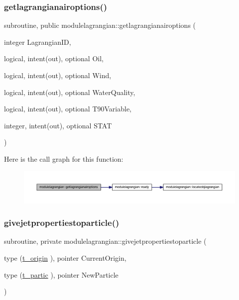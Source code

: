 \subsubsection{\texorpdfstring{getlagrangianairoptions()}{getlagrangianairoptions()}}
{\footnotesize\ttfamily subroutine, public modulelagrangian\+::getlagrangianairoptions (\begin{DoxyParamCaption}\item[{integer}]{Lagrangian\+ID,  }\item[{logical, intent(out), optional}]{Oil,  }\item[{logical, intent(out), optional}]{Wind,  }\item[{logical, intent(out), optional}]{Water\+Quality,  }\item[{logical, intent(out), optional}]{T90\+Variable,  }\item[{integer, intent(out), optional}]{S\+T\+AT }\end{DoxyParamCaption})}

Here is the call graph for this function\+:\nopagebreak
\begin{figure}[H]
\begin{center}
\leavevmode
\includegraphics[width=350pt]{namespacemodulelagrangian_acfabdebec80bc9e9353be9b171fdbbdb_cgraph}
\end{center}
\end{figure}
\mbox{\label{namespacemodulelagrangian_a71c61c30f1e91a2e99d88358b92559eb}} 
\subsubsection{\texorpdfstring{givejetpropertiestoparticle()}{givejetpropertiestoparticle()}}
{\footnotesize\ttfamily subroutine, private modulelagrangian\+::givejetpropertiestoparticle (\begin{DoxyParamCaption}\item[{type (\mbox{\hyperlink{structmodulelagrangian_1_1t__origin}{t\+\_\+origin}} ), pointer}]{Current\+Origin,  }\item[{type (\mbox{\hyperlink{structmodulelagrangian_1_1t__partic}{t\+\_\+partic}} ), pointer}]{New\+Particle }\end{DoxyParamCaption})\hspace{0.3cm}{\ttfamily [private]}}

